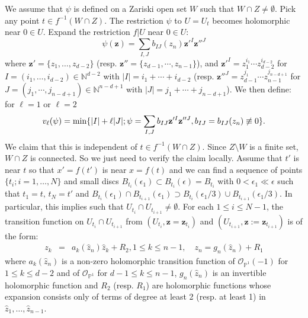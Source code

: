 \documentclass[12pt]{amsart}
\theoremstyle{definition}
\def\min{{\rm min}}
\def\bz{{\mathbf{z}}}
\newcommand{\IN}{{\mathbb N}}
\newcommand{\IP}{{\mathbb P}}
\newcommand{\CO}{{\mathcal O}}
\begin{document}
We assume that $\psi$ is defined on a Zariski open set $W$ such that $W\cap Z\neq \emptyset$.
Pick any point $t\in f^{-1}(W\cap Z)$. %
The restriction $\psi$ to $U=U_t$ becomes holomorphic near $0\in U$. Expand the restriction $f|U$ near $0\in U$:
\begin{equation}\label{eq-psiex}
    \psi(\bz)=\sum_{I,J} {b_{IJ}}(z_n) \bz'^I \bz''^J
\end{equation}
where $\bz'=\{z_1, \dots, z_{d-2}\}$ (resp. $\bz''=\{z_{d-1},\cdots, z_{n-1}\}$), and $\bz'^I=z_1^{i_1}\cdots z_{d-2}^{i_{d-2}}$ for $I=(i_1, \dots, i_{d-2})\in \IN^{d-2}$ with $|I|=i_1+\cdots+i_{d-2}$ (resp. $\bz''^{J}=z_{d-1}^{j_1}\cdots z_{n-1}^{j_{n-d+1}}$ for $J=(j_1,\cdots,j_{n-d+1})\in \IN^{n-d+1}$ with $|J|=j_1+\cdots+j_{n-d+1}$). 
We then define: for $\ell=1$ or $\ell=2$
\begin{equation}\label{eq-vpsi}
    v_\ell(\psi)=\min\{|I|+\ell |J|; \psi=\sum_{I,J} {b_{IJ}}\bz'^I \bz''^J, b_{IJ}=b_{IJ}(z_n)\not\equiv 0\}.
\end{equation}
We claim that this is independent of $t\in f^{-1}(W\cap Z)$. Since $Z\setminus W$ is a finite set, $W\cap Z$ is connected. So we just need to verify the claim locally. Assume that $t'$ is near $t$ so that $x'=f(t')$ is near $x=f(t)$ and we
can find a sequence of points $\{t_i; i=1, \dots, N\}$ and small discs $B_{t_i}(\epsilon_1)\subset B_{t_i}(\epsilon)=B_{t_i}$ with $0<\epsilon_1\ll \epsilon$ such that $t_1=t,\,t_N=t'$ and $B_{t_i}(\epsilon_1)\cap B_{t_{i+1}}(\epsilon_1)\supset B_{t_i}(\epsilon_1/3)\cup B_{t_{i+1}}(\epsilon_1/3)$. In particular, this implies
such that $U_{t_i}\cap U_{t_{i+1}}\neq \emptyset$. 
For each $1\le i\le N-1$, the transition function on $U_{t_i}\cap U_{t_{i+1}}$ from $(U_{t_i}, \bz=\bz_{t_i})$ and $(U_{t_{i+1}}, \hat{\bz}:=\bz_{t_{i+1}})$ is of the form:
\begin{eqnarray}\label{eq-trfct}
    z_k&=&a_k(\hat{z}_n) \hat{z}_k+R_2, 1\le k\le n-1, \quad z_n=g_n(\hat{z}_n)+R_1 
\end{eqnarray}
where $a_k(\hat{z}_n)$ is a non-zero holomorphic transition function of $\CO_{\IP^1}(-1)$ for $1\le k\le d-2$ and of $\CO_{\IP^1}$ for $d-1\le k\le n-1$, $g_n(\hat{z}_n)$ is an invertible holomorphic function and $R_2$ (resp. $R_1$) are holomorphic functions whose expansion consists only of terms of degree at least 2 (resp. at least 1) in $\hat{z}_1, \dots, \hat{z}_{n-1}$. 
\end{document}
